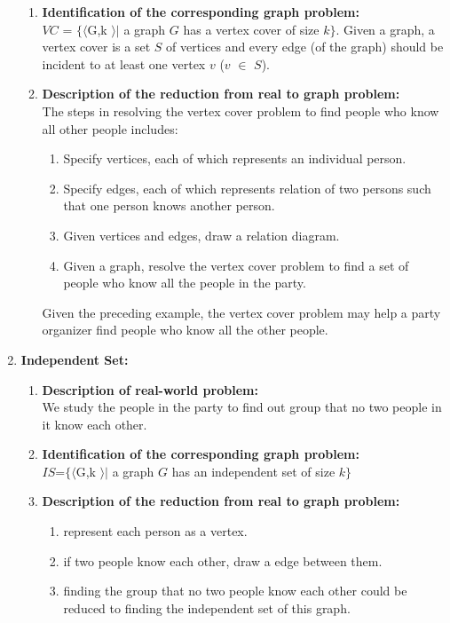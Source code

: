 \documentclass[article, 10pt,onecolumn]{article}
\begin{document}
\begin{enumerate}
\begin{enumerate}
      \item \textbf{Identification of the corresponding graph problem:}\\
    $VC$ = $\{\langle $G,k $ \rangle | $ a graph $G$ has a vertex cover of size $k\}$. 
    Given a graph, a vertex cover is a set $S$ of vertices and every edge (of the graph) should be incident to at least one vertex $v$ ($v$ $\in$ $S$).
   \item \textbf{Description of the reduction from real to graph problem:}\\
       The steps in resolving the vertex cover problem to find people who know all other people includes: 
    \begin{enumerate}
	    \item Specify vertices, each of which represents an individual person.
	    \item Specify edges, each of which represents relation of two persons such that one person knows another person.
	    \item Given vertices and edges, draw a relation diagram.
	    \item Given a graph, resolve the vertex cover problem to find a set of people who know all the people in the party.
    \end{enumerate}
    Given the preceding example, the vertex cover problem may help a party organizer
    find people who know all the other people.
  \end{enumerate}
  
\item \textbf{Independent Set:}
\begin{enumerate}
 		\item\textbf{Description of real-world problem:} \\
   		We study the people in the party to find out group that no two people in it know each other.
  	\item\textbf{Identification of the corresponding graph problem:}\\
  		$IS$=$\{\langle $G,k $ \rangle | $ a graph $G$ has an independent set of size $k\}$
  	\item \textbf{Description of the reduction from real to graph problem:}	
  		\begin{enumerate}
			\item represent each person as a vertex.
			\item if two people know each other, draw a edge between them.
			\item finding the group that no two people know each other could be reduced to finding the independent set of this graph.
			\end{enumerate}
  	

\end{enumerate}
\end{enumerate}
\end{document}
